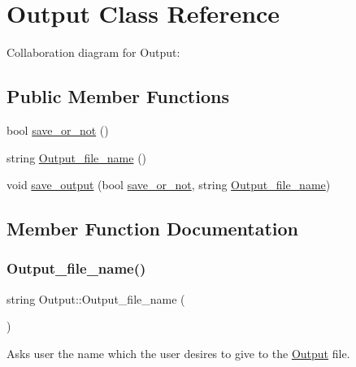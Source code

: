 \hypertarget{classOutput}{}\section{Output Class Reference}
\label{classOutput}


Collaboration diagram for Output\+:
\subsection*{Public Member Functions}
\begin{DoxyCompactItemize}
\item 
bool \hyperlink{classOutput_af1d58420785a9c9601c6888df473fc96}{save\+\_\+or\+\_\+not} ()
\item 
string \hyperlink{classOutput_a0df9c8e902530f9839ef0a31f7a4e42d}{Output\+\_\+file\+\_\+name} ()
\item 
void \hyperlink{classOutput_add61bdc5030a63a127ad67e70288a3e9}{save\+\_\+output} (bool \hyperlink{classOutput_af1d58420785a9c9601c6888df473fc96}{save\+\_\+or\+\_\+not}, string \hyperlink{classOutput_a0df9c8e902530f9839ef0a31f7a4e42d}{Output\+\_\+file\+\_\+name})
\end{DoxyCompactItemize}


\subsection{Member Function Documentation}
\mbox{\label{classOutput_a0df9c8e902530f9839ef0a31f7a4e42d}} 
\subsubsection{\texorpdfstring{Output\+\_\+file\+\_\+name()}{Output\_file\_name()}}
{\footnotesize\ttfamily string Output\+::\+Output\+\_\+file\+\_\+name (\begin{DoxyParamCaption}{ }\end{DoxyParamCaption})\hspace{0.3cm}{\ttfamily [inline]}}

Asks user the name which the user desires to give to the \hyperlink{classOutput}{Output} file.\mbox{\label{classOutput_af1d58420785a9c9601c6888df473fc96}} 
